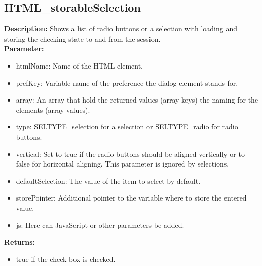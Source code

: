 \subsection{HTML\_storableSelection}
\textbf{Description:} Shows a list of radio buttons or a selection with loading and storing the checking state to and from the session.\\
\textbf{Parameter:}
\begin{itemize}
\item htmlName: Name of the HTML element.
\item prefKey: Variable name of the preference the dialog element stands for.
\item array: An array that hold the returned values (array keys) the naming for the elements (array values).
\item type: SELTYPE\_selection for a selection or SELTYPE\_radio for radio buttons.
\item vertical: Set to true if the radio buttons should be aligned vertically or to false for horizontal aligning. This parameter is ignored by selections.
\item defaultSelection: The value of the item to select by default.
\item storePointer: Additional pointer to the variable where to store the entered value.
\item js: Here can JavaScript or other parameters be added.
\end{itemize}
\textbf{Returns:}
\begin{itemize}
\item true if the check box is checked.
\end{itemize}

